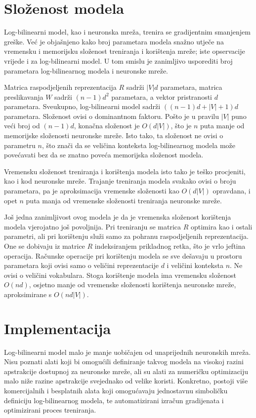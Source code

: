 \documentclass[times, utf8, diplomski, numeric]{fer}
\begin{document}
\section{Složenost modela}

Log-bilinearni model, kao i neuronska mreža, trenira se gradijentnim smanjenjem greške. Već je objašnjeno kako broj parametara modela snažno utječe na vremensku i memorijsku složenost treniranja i korištenja mreže; iste opservacije vrijede i za log-bilinearni model. U tom smislu je zanimljivo usporediti broj parametara log-bilinearnog modela i neuronske mreže.

Matrica raspodjeljenih reprezentacija $R$ sadrži $|V| d$ parametara, matrica preslikavanja $W$ sadrži $(n - 1) d^2$ parametara, a vektor pristranosti $d$ parametara. Sveukupno, log-bilinearni model sadrži $\left((n - 1) d + |V| + 1\right) d$ parametara. Složenost ovisi o dominantnom faktoru. Pošto je u pravilu $|V|$ puno veći broj od $(n - 1) d$, konačna složenost je $O(d |V|)$, što je $n$ puta manje od memorijske složenosti neuronske mreže. Isto tako, ta složenost ne ovisi o parametru $n$, što znači da se veličina konteksta log-bilinearnog modela može povećavati bez da se znatno poveća memorijska složenost modela.

Vremensku složenost treniranja i korištenja modela isto tako je teško procjeniti, kao i kod neuronske mreže. Trajanje treniranja modela svakako ovisi o broju parametara, pa je aproksimacija vremenske složenosti kao $O(d |V|)$ opravdana, i opet $n$ puta manja od vremenske složenosti treniranja neuronske mreže.

Još jedna zanimljivost ovog modela je da je vremenska složenost korištenja modela vjerojatno još povoljnija. Pri treniranju se matrica $R$ optimira kao i ostali parametri, ali pri korištenju služi samo za pohranu raspodjeljenih reprezentacija. One se dobivaju iz matrice $R$ indeksiranjem prikladnog retka, što je vrlo jeftina operacija. Računske operacije pri korištenju modela se sve dešavaju u prostoru parametara koji ovisi samo o veličini reprezentacije $d$ i veličini konteksta $n$. Ne ovisi o veličini vokabulara. Stoga korištenje modela ima vremensku složenost $O(n d)$, osjetno manje od vremenske složenosti korištenja neuronske mreže, aproksimirane s $O(n d |V|)$.

\section{Implementacija}

Log-bilinearni model malo je manje uobičajen od unaprijednih neuronskih mreža. Nisu poznati alati koji bi omogućili definiranje takvog modela na visokoj razini apstrakcije dostupnoj za neuronske mreže, ali su alati za numeričku optimizaciju malo niže razine apstrakcije svejednako od velike koristi. Konkretno, postoji više komercijalnih i besplatnih alata koji omogućavaju jednostavnu simboličku definiciju log-bilinearnog modela, te automatizirani izračun gradijenata i optimizirani proces treniranja.
\end{document}
